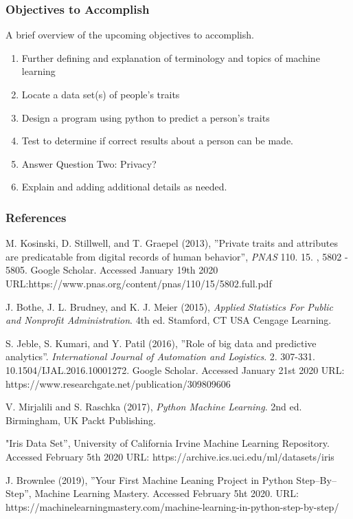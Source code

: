 \documentclass{beamer}
\begin{document}
\begin{frame}
\frametitle{Objectives to Accomplish}
A brief overview of the upcoming objectives to accomplish.
\begin{enumerate}
     \item Further defining and explanation of terminology and topics of machine learning
     \item Locate a data set(s) of people's traits 
     \item Design a program using python to predict a person's traits
     \item Test to determine if correct results about a person can be made.
     \item Answer Question Two: Privacy?
     \item Explain and adding additional details as needed.
\end{enumerate}
\end{frame}

\begin{frame}
\frametitle{References}
\fontsize{9}{11}
\begin{thebibliography}{9}

M. Kosinski, D. Stillwell, and T. Graepel (2013),
''Private traits and attributes are predicatable from digital records of human behavior'', \textit{PNAS} 110. 15. , 5802 - 5805. Google Scholar. Accessed January 19th 2020 URL:https://www.pnas.org/content/pnas/110/15/5802.full.pdf

J. Bothe, J. L. Brudney, and K. J. Meier (2015), \textit{Applied Statistics For Public and Nonprofit Administration}. 4th ed. Stamford, CT USA Cengage Learning.

S. Jeble, S. Kumari, and Y. Patil (2016),
''Role of big data and predictive analytics''. \textit{International Journal of Automation and Logistics}. 2. 307-331. 10.1504/IJAL.2016.10001272. Google Scholar. Accessed January 21st 2020 URL: https://www.researchgate.net/publication/309809606

V. Mirjalili and S. Raschka (2017),
\textit{Python Machine Learning}. 2nd ed. Birmingham, UK Packt Publishing.

"Iris Data Set'', University of California Irvine Machine Learning Repository. Accessed February 5th 2020 URL: https://archive.ics.uci.edu/ml/datasets/iris

J. Brownlee (2019),
''Your First Machine Leaning Project in Python Step--By--Step'', Machine Learning Mastery. Accessed February 5ht 2020. URL: https://machinelearningmastery.com/machine-learning-in-python-step-by-step/

\end{thebibliography}
\end{frame}
 
\end{document}
